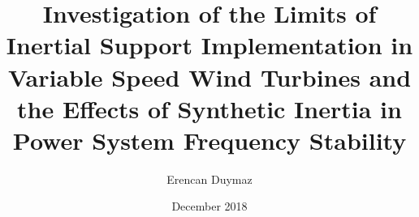 \documentclass[chaparabic,ee,ms,12pt,oneandhalf]{metu}
\author{Erencan Duymaz}
\title{Investigation of the Limits of Inertial Support Implementation in Variable Speed Wind Turbines and the Effects of Synthetic Inertia in Power System Frequency Stability}
\date{December 2018}
\begin{document}
\begin{preliminaries}



\end{preliminaries}
%   
% 
%

\setlength{\parindent}{0em}
\setlength{\parskip}{10pt}











%
%

%

\appendix

\end{document}
